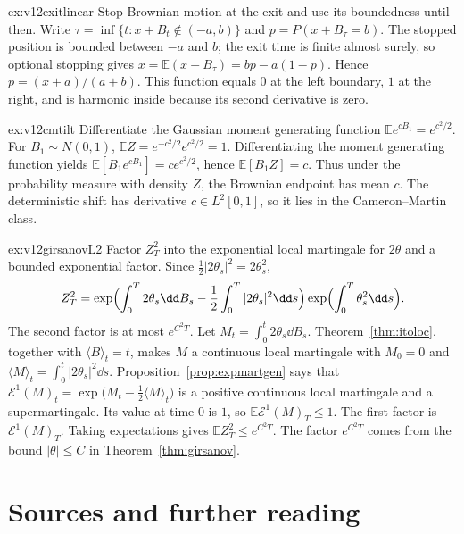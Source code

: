 \begin{solution}{ex:v12exitlinear}
\idea Stop Brownian motion at the exit and use its boundedness until then.
\writeup Write $\tau=\inf\{t:x+B_t\notin(-a,b)\}$ and $p=P(x+B_\tau=b)$. The stopped position is bounded between $-a$ and $b$; the exit time is finite almost surely, so optional stopping gives $x=\mathbb E(x+B_\tau)=bp-a(1-p)$. Hence $p=(x+a)/(a+b)$. This function equals $0$ at the left boundary, $1$ at the right, and is harmonic inside because its second derivative is zero.
\end{solution}

\begin{solution}{ex:v12cmtilt}
\idea Differentiate the Gaussian moment generating function $\mathbb Ee^{cB_1}=e^{c^2/2}$.
\writeup For $B_1\sim N(0,1)$, $\mathbb EZ=e^{-c^2/2}e^{c^2/2}=1$. Differentiating the moment generating function yields $\mathbb E[B_1e^{cB_1}]=ce^{c^2/2}$, hence $\mathbb E[B_1Z]=c$. Thus under the probability measure with density $Z$, the Brownian endpoint has mean $c$. The deterministic shift has derivative $c\in L^2[0,1]$, so it lies in the Cameron--Martin class.
\end{solution}

\begin{solution}{ex:v12girsanovL2}
\idea Factor $Z_T^2$ into the exponential local martingale for $2\theta$ and a bounded exponential factor.
\writeup Since $\frac12|2\theta_s|^2=2\theta_s^2$,
\[
Z_T^2=\exp\Bigl(\int_0^T 2\theta_s\dd B_s-\frac12\int_0^T|2\theta_s|^2\dd s\Bigr)\exp\Bigl(\int_0^T\theta_s^2\dd s\Bigr).
\]
The second factor is at most $e^{C^2T}$. Let $M_t=\int_0^t 2\theta_s\dd B_s$. Theorem~\ref{thm:itoloc}, together with $\langle B\rangle_t=t$, makes $M$ a continuous local martingale with $M_0=0$ and $\langle M\rangle_t=\int_0^t|2\theta_s|^2\dd s$. Proposition~\ref{prop:expmartgen} says that $\mathcal E^1(M)_t=\exp\bigl(M_t-\frac12\langle M\rangle_t\bigr)$ is a positive continuous local martingale and a supermartingale. Its value at time $0$ is $1$, so $\mathbb E\mathcal E^1(M)_T\le1$. The first factor is $\mathcal E^1(M)_T$. Taking expectations gives $\mathbb EZ_T^2\le e^{C^2T}$. The factor $e^{C^2T}$ comes from the bound $|\theta|\le C$ in Theorem~\ref{thm:girsanov}.
\end{solution}

\section*{Sources and further reading}


